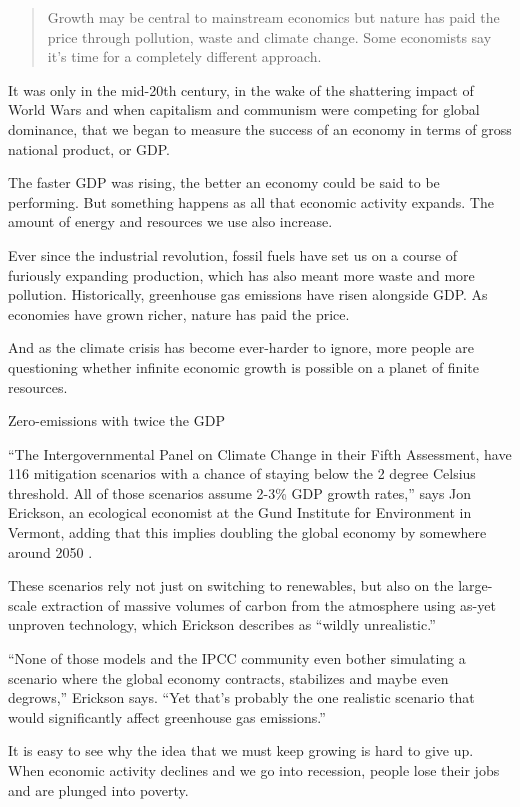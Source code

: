 \documentclass[
]{book}
\begin{document}
\begin{quote}
Growth may be central to mainstream economics but nature has paid the price through pollution, waste and climate change. Some economists say it's time for a completely different approach.
\end{quote}

It was only in the mid-20th century, in the wake of the shattering impact of World Wars and when capitalism and communism were competing for global dominance, that we began to measure the success of an economy in terms of gross national product, or GDP.

The faster GDP was rising, the better an economy could be said to be performing. But something happens as all that economic activity expands. The amount of energy and resources we use also increase.

Ever since the industrial revolution, fossil fuels have set us on a course of furiously expanding production, which has also meant more waste and more pollution. Historically, greenhouse gas emissions have risen alongside GDP. As economies have grown richer, nature has paid the price.

And as the climate crisis has become ever-harder to ignore, more people are questioning whether infinite economic growth is possible on a planet of finite resources.

Zero-emissions with twice the GDP

``The Intergovernmental Panel on Climate Change in their Fifth Assessment, have 116 mitigation scenarios with a chance of staying below the 2 degree Celsius threshold. All of those scenarios assume 2-3\% GDP growth rates,'' says Jon Erickson, an ecological economist at the Gund Institute for Environment in Vermont, adding that this implies doubling the global economy by somewhere around 2050 .

These scenarios rely not just on switching to renewables, but also on the large-scale extraction of massive volumes of carbon from the atmosphere using as-yet unproven technology, which Erickson describes as ``wildly unrealistic.''

``None of those models and the IPCC community even bother simulating a scenario where the global economy contracts, stabilizes and maybe even degrows,'' Erickson says. ``Yet that's probably the one realistic scenario that would significantly affect greenhouse gas emissions.''

It is easy to see why the idea that we must keep growing is hard to give up. When economic activity declines and we go into recession, people lose their jobs and are plunged into poverty.
\end{document}
